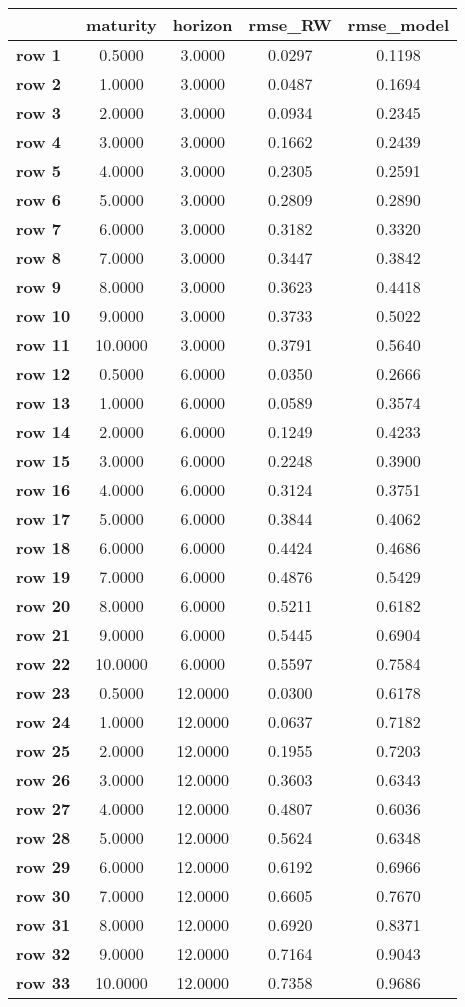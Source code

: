 \begin{tiny}\begin{tabular}{|l|c|c|c|c|}
\hline
&\textbf{maturity}&\textbf{horizon}&\textbf{rmse_RW}&\textbf{rmse_model}\\\hline
\textbf{row 1}&0.5000&3.0000&0.0297&0.1198\\\hline
\textbf{row 2}&1.0000&3.0000&0.0487&0.1694\\\hline
\textbf{row 3}&2.0000&3.0000&0.0934&0.2345\\\hline
\textbf{row 4}&3.0000&3.0000&0.1662&0.2439\\\hline
\textbf{row 5}&4.0000&3.0000&0.2305&0.2591\\\hline
\textbf{row 6}&5.0000&3.0000&0.2809&0.2890\\\hline
\textbf{row 7}&6.0000&3.0000&0.3182&0.3320\\\hline
\textbf{row 8}&7.0000&3.0000&0.3447&0.3842\\\hline
\textbf{row 9}&8.0000&3.0000&0.3623&0.4418\\\hline
\textbf{row 10}&9.0000&3.0000&0.3733&0.5022\\\hline
\textbf{row 11}&10.0000&3.0000&0.3791&0.5640\\\hline
\textbf{row 12}&0.5000&6.0000&0.0350&0.2666\\\hline
\textbf{row 13}&1.0000&6.0000&0.0589&0.3574\\\hline
\textbf{row 14}&2.0000&6.0000&0.1249&0.4233\\\hline
\textbf{row 15}&3.0000&6.0000&0.2248&0.3900\\\hline
\textbf{row 16}&4.0000&6.0000&0.3124&0.3751\\\hline
\textbf{row 17}&5.0000&6.0000&0.3844&0.4062\\\hline
\textbf{row 18}&6.0000&6.0000&0.4424&0.4686\\\hline
\textbf{row 19}&7.0000&6.0000&0.4876&0.5429\\\hline
\textbf{row 20}&8.0000&6.0000&0.5211&0.6182\\\hline
\textbf{row 21}&9.0000&6.0000&0.5445&0.6904\\\hline
\textbf{row 22}&10.0000&6.0000&0.5597&0.7584\\\hline
\textbf{row 23}&0.5000&12.0000&0.0300&0.6178\\\hline
\textbf{row 24}&1.0000&12.0000&0.0637&0.7182\\\hline
\textbf{row 25}&2.0000&12.0000&0.1955&0.7203\\\hline
\textbf{row 26}&3.0000&12.0000&0.3603&0.6343\\\hline
\textbf{row 27}&4.0000&12.0000&0.4807&0.6036\\\hline
\textbf{row 28}&5.0000&12.0000&0.5624&0.6348\\\hline
\textbf{row 29}&6.0000&12.0000&0.6192&0.6966\\\hline
\textbf{row 30}&7.0000&12.0000&0.6605&0.7670\\\hline
\textbf{row 31}&8.0000&12.0000&0.6920&0.8371\\\hline
\textbf{row 32}&9.0000&12.0000&0.7164&0.9043\\\hline
\textbf{row 33}&10.0000&12.0000&0.7358&0.9686\\\hline
\end{tabular}
\end{tiny}